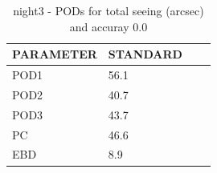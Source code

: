 \begin{table}[p!]
\begin{center}
\begin{tabular}{|l|l|l|l|}
\hline
\multicolumn{1}{|c|}{\cellcolor[HTML]{C0C0C0}\textbf{PARAMETER}} & \multicolumn{1}{c|}{\cellcolor[HTML]{C0C0C0}\textbf{STANDARD}}\\
\hline
\cellcolor[HTML]{C0C0C0}POD1  & 56.1                                \\
\cellcolor[HTML]{C0C0C0}POD2  & 40.7                                \\
\cellcolor[HTML]{C0C0C0}POD3  & 43.7                                \\
\cellcolor[HTML]{C0C0C0}PC    & 46.6                                  \\
\cellcolor[HTML]{C0C0C0}EBD   & 8.9                                 \\
\hline
\end{tabular}
\caption{night3 - PODs for total seeing (arcsec) and accuray 0.0}
\label{tab:podsee0.0:night3}
\end{center}
\end{table}
